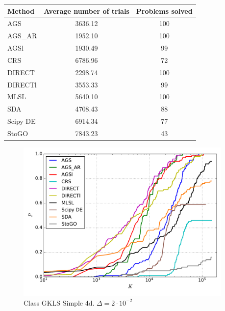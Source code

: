 \documentclass[a4paper]{article}
\begin{document}
\begin{tabular}{lcc}
\hline
 Method   &  Average number of trials  &  Problems solved  \\
\hline
 AGS      &          3636.12           &        100        \\
 AGS\_AR   &          1952.10           &        100        \\
 AGSl     &          1930.49           &        99         \\
 CRS      &          6786.96           &        72         \\
 DIRECT   &          2298.74           &        100        \\
 DIRECTl  &          3553.33           &        99         \\
 MLSL     &          5640.10           &        100        \\
 SDA      &          4708.43           &        88         \\
 Scipy DE &          6914.34           &        77         \\
 StoGO    &          7843.23           &        43         \\
\hline
\end{tabular}
\begin{figure}[H]
  \center
  \includegraphics[width=0.95\textwidth]{../experiments/gklss4d/cmc.pdf}
  \caption{Class GKLS Simple 4d. $\Delta=2\cdot10^{-2}$}
\end{figure}
\end{document}
